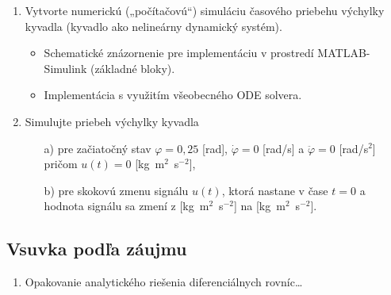 \documentclass[a4paper, 10pt, ]{article}
\begin{document}
\begin{enumerate}[leftmargin=0pt, labelsep=4mm, itemsep=0pt]

	\item Vytvorte numerickú („počítačovú“) simuláciu časového priebehu výchylky kyvadla (kyvadlo ako nelineárny dynamický systém).

    \begin{itemize}[leftmargin=0pt, labelsep=4mm, itemsep=0pt]
        \item Schematické znázornenie pre implementáciu v prostredí MATLAB-Simulink (základné bloky).
        \item Implementácia s využitím všeobecného ODE solvera.
    \end{itemize}

    \item Simulujte priebeh výchylky kyvadla
    \begin{itemize}[leftmargin=0pt, labelsep=4mm, itemsep=0pt]
        \item[a)] pre začiatočný stav $\varphi = 0,25$ [rad], $\dot\varphi = 0$ [rad/s] a $\ddot\varphi = 0$ [rad/s$^{2}$] pričom $u(t) = 0$ [kg~m$^2$~s$^{-2}$],
        \item[b)] pre skokovú zmenu signálu $u(t)$, ktorá nastane v čase $t=0$ a hodnota signálu sa zmení z  [kg~m$^2$~s$^{-2}$] na  [kg~m$^2$~s$^{-2}$].
    \end{itemize}



\end{enumerate}





\subsection{Vsuvka podľa záujmu}

\begin{enumerate}[leftmargin=0pt, labelsep=4mm, itemsep=0pt]

    \item Opakovanie analytického riešenia diferenciálnych rovníc\ldots
	
	
\end{enumerate}
\end{document}
